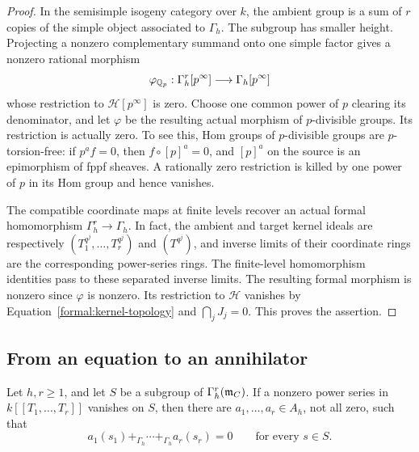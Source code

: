\begin{proof}
In the semisimple isogeny category over $k$, the ambient group is a
sum of $r$ copies of the simple object associated to $\Gamma_h$.
The subgroup has smaller height. Projecting a nonzero complementary
summand onto one simple factor gives a nonzero rational morphism
\[
  \varphi_{\mathbb Q_p}:\Gamma_h^r[p^\infty]
  \longrightarrow\Gamma_h[p^\infty]
\]
whose restriction to $\mathcal H[p^\infty]$ is zero.
Choose one common power of $p$ clearing its denominator, and let
$\varphi$ be the resulting actual morphism of $p$-divisible groups.
Its restriction is actually zero. To see this, Hom groups of
$p$-divisible groups are $p$-torsion-free: if $p^a f=0$, then
$f\circ[p]^a=0$, and $[p]^a$ on the source is an epimorphism of
fppf sheaves. A rationally zero restriction is killed by one power
of $p$ in its Hom group and hence vanishes.

The compatible coordinate maps at finite levels recover an actual
formal homomorphism $\Gamma_h^r\to\Gamma_h$. In fact, the ambient
and target kernel ideals are respectively
$(T_1^{q^j},\ldots,T_r^{q^j})$ and $(T^{q^j})$, and inverse limits
of their coordinate rings are the corresponding power-series rings.
The finite-level homomorphism identities pass to these separated
inverse limits. The resulting formal morphism is nonzero since
$\varphi$ is nonzero. Its restriction to $\mathcal H$ vanishes by
Equation~\eqref{formal:kernel-topology} and
$\bigcap_j J_j=0$. This proves the assertion.
\end{proof}

\subsection{From an equation to an annihilator}

\begin{proposition}\label{formal:closure}
Let $h,r\geq1$, and let $S$ be a subgroup of
$\Gamma_h^r(\mathfrak m_C)$. If a nonzero power series in
$k[[T_1,\ldots,T_r]]$ vanishes on $S$, then there are
$a_1,\ldots,a_r\in A_h$, not all zero, such that
\[
  a_1(s_1)+_{\Gamma_h}\cdots+_{\Gamma_h}a_r(s_r)=0
  \qquad\text{for every }s\in S.
\]
\end{proposition}

